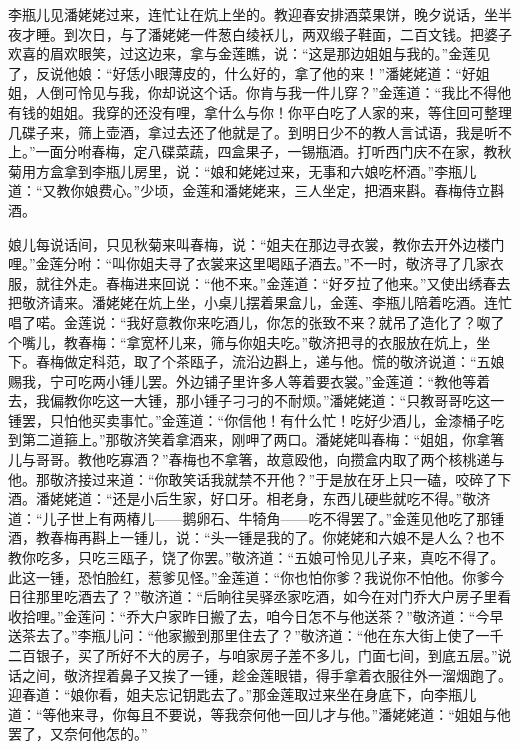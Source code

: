 李瓶儿见潘姥姥过来，连忙让在炕上坐的。教迎春安排酒菜果饼，晚夕说话，坐半夜才睡。到次日，与了潘姥姥一件葱白绫袄儿，两双缎子鞋面，二百文钱。把婆子欢喜的眉欢眼笑，过这边来，拿与金莲瞧，说：“这是那边姐姐与我的。”金莲见了，反说他娘：“好恁小眼薄皮的，什么好的，拿了他的来！”潘姥姥道：“好姐姐，人倒可怜见与我，你却说这个话。你肯与我一件儿穿？”金莲道：“我比不得他有钱的姐姐。我穿的还没有哩，拿什么与你！你平白吃了人家的来，等住回可整理几碟子来，筛上壶酒，拿过去还了他就是了。到明日少不的教人\textShiDian 言试语，我是听不上。”一面分咐春梅，定八碟菜蔬，四盒果子，一锡瓶酒。打听西门庆不在家，教秋菊用方盒拿到李瓶儿房里，说：“娘和姥姥过来，无事和六娘吃杯酒。”李瓶儿道：“又教你娘费心。”少顷，金莲和潘姥姥来，三人坐定，把酒来斟。春梅侍立斟酒。

娘儿每说话间，只见秋菊来叫春梅，说：“姐夫在那边寻衣裳，教你去开外边楼门哩。”金莲分咐：“叫你姐夫寻了衣裳来这里喝瓯子酒去。”不一时，敬济寻了几家衣服，就往外走。春梅进来回说：“他不来。”金莲道：“好歹拉了他来。”又使出绣春去把敬济请来。潘姥姥在炕上坐，小桌儿摆着果盒儿，金莲、李瓶儿陪着吃酒。连忙唱了喏。金莲说：“我好意教你来吃酒儿，你怎的张致不来？就吊了造化了？呶了个嘴儿，教春梅：“拿宽杯儿来，筛与你姐夫吃。”敬济把寻的衣服放在炕上，坐下。春梅做定科范，取了个茶瓯子，流沿边斟上，递与他。慌的敬济说道：“五娘赐我，宁可吃两小锺儿罢。外边铺子里许多人等着要衣裳。”金莲道：“教他等着去，我偏教你吃这一大锺，那小锺子刁刁的不耐烦。”潘姥姥道：“只教哥哥吃这一锺罢，只怕他买卖事忙。”金莲道：“你信他！有什么忙！吃好少酒儿，金漆桶子吃到第二道箍上。”那敬济笑着拿酒来，刚呷了两口。潘姥姥叫春梅：“姐姐，你拿箸儿与哥哥。教他吃寡酒？”春梅也不拿箸，故意殴他，向攒盒内取了两个核桃递与他。那敬济接过来道：“你敢笑话我就禁不开他？”于是放在牙上只一磕，咬碎了下酒。潘姥姥道：“还是小后生家，好口牙。相老身，东西儿硬些就吃不得。”敬济道：“儿子世上有两椿儿——鹅卵石、牛犄角——吃不得罢了。”金莲见他吃了那锺酒，教春梅再斟上一锺儿，说：“头一锺是我的了。你姥姥和六娘不是人么？也不教你吃多，只吃三瓯子，饶了你罢。”敬济道：“五娘可怜见儿子来，真吃不得了。此这一锺，恐怕脸红，惹爹见怪。”金莲道：“你也怕你爹？我说你不怕他。你爹今日往那里吃酒去了？”敬济道：“后晌往吴驿丞家吃酒，如今在对门乔大户房子里看收拾哩。”金莲问：“乔大户家昨日搬了去，咱今日怎不与他送茶？”敬济道：“今早送茶去了。”李瓶儿问：“他家搬到那里住去了？”敬济道：“他在东大街上使了一千二百银子，买了所好不大的房子，与咱家房子差不多儿，门面七间，到底五层。”说话之间，敬济捏着鼻子又挨了一锺，趁金莲眼错，得手拿着衣服往外一溜烟跑了。迎春道：“娘你看，姐夫忘记钥匙去了。”那金莲取过来坐在身底下，向李瓶儿道：“等他来寻，你每且不要说，等我奈何他一回儿才与他。”潘姥姥道：“姐姐与他罢了，又奈何他怎的。”

